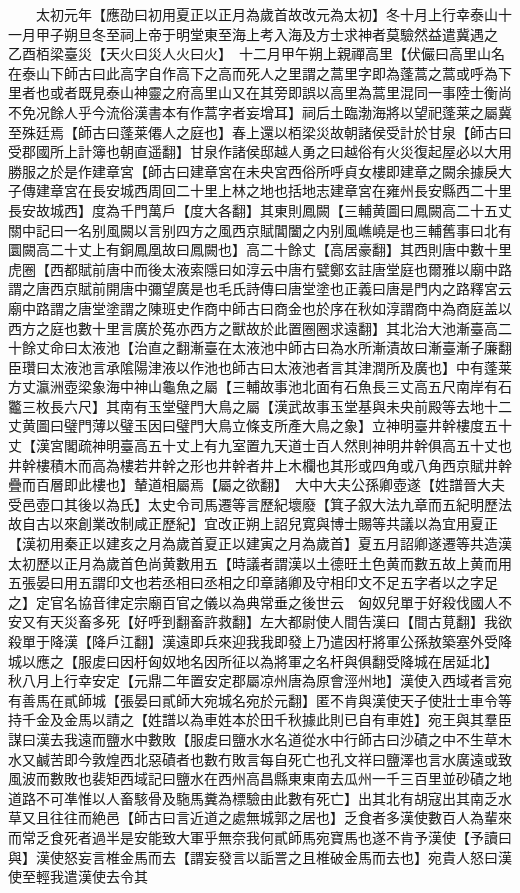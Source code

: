 　　太初元年【應劭曰初用夏正以正月為歲首故改元為太初】冬十月上行幸泰山十一月甲子朔旦冬至祠上帝于明堂東至海上考入海及方士求神者莫驗然益遣冀遇之　乙酉栢梁臺災【天火曰災人火曰火】　十二月甲午朔上親禪高里【伏儼曰高里山名在泰山下師古曰此高字自作高下之高而死人之里謂之蒿里字即為蓬蒿之蒿或呼為下里者也或者既見泰山神靈之府高里山又在其旁即誤以高里為蒿里混同一事陸士衡尚不免况餘人乎今流俗漢書本有作蒿字者妄增耳】祠后土臨渤海將以望祀蓬莱之屬冀至殊廷焉【師古曰蓬莱僊人之庭也】春上還以栢梁災故朝諸侯受計於甘泉【師古曰受郡國所上計簿也朝直遥翻】甘泉作諸侯邸越人勇之曰越俗有火災復起屋必以大用勝服之於是作建章宮【師古曰建章宮在未央宮西俗所呼貞女樓即建章之闕余據戾大子傳建章宮在長安城西周回二十里上林之地也括地志建章宮在雍州長安縣西二十里長安故城西】度為千門萬戶【度大各翻】其東則鳳闕【三輔黄圖曰鳳闕高二十五丈關中記曰一名别風闕以言别四方之風西京賦閶闔之内别風嶕嶢是也三輔舊事曰北有圜闕高二十丈上有銅鳳凰故曰鳳闕也】高二十餘丈【高居豪翻】其西則唐中數十里虎圈【西都賦前唐中而後太液索隱曰如淳云中唐冇甓鄭玄註唐堂庭也爾雅以廟中路謂之唐西京賦前開唐中彌望廣是也毛氏詩傳曰唐堂塗也正義曰唐是門内之路釋宮云廟中路謂之唐堂塗謂之陳班史作商中師古曰商金也於序在秋如淳謂商中為商庭盖以西方之庭也數十里言廣於菟亦西方之獸故於此置圈圈求遠翻】其北治大池漸臺高二十餘丈命曰太液池【治直之翻漸臺在太液池中師古曰為水所漸漬故曰漸臺漸子廉翻臣瓚曰太液池言承隂陽津液以作池也師古曰太液池者言其津潤所及廣也】中有蓬莱方丈瀛洲壺梁象海中神山龜魚之屬【三輔故事池北面有石魚長三丈高五尺南岸有石龞三枚長六尺】其南有玉堂璧門大鳥之屬【漢武故事玉堂基與未央前殿等去地十二丈黄圖曰璧門薄以璧玉因曰璧門大鳥立條支所產大鳥之象】立神明臺井幹樓度五十丈【漢宮閣疏神明臺高五十丈上有九室置九天道士百人然則神明井幹俱高五十丈也井幹樓積木而高為樓若井幹之形也井幹者井上木欄也其形或四角或八角西京賦井幹疊而百層即此樓也】輦道相屬焉【屬之欲翻】　大中大夫公孫卿壺遂【姓譜晉大夫受邑壺口其後以為氏】太史令司馬遷等言歷紀壞廢【箕子叙大法九章而五紀明歷法故自古以來創業改制咸正歷紀】宜改正朔上詔兒寛與博士賜等共議以為宜用夏正【漢初用秦正以建亥之月為歲首夏正以建寅之月為歲首】夏五月詔卿遂遷等共造漢太初歷以正月為歲首色尚黄數用五【時議者謂漢以土德旺土色黄而數五故上黄而用五張晏曰用五謂印文也若丞相曰丞相之印章諸卿及守相印文不足五字者以之字足之】定官名協音律定宗廟百官之儀以為典常垂之後世云　匈奴兒單于好殺伐國人不安又有天災畜多死【好呼到翻畜許救翻】左大都尉使人間告漢曰【間古莧翻】我欲殺單于降漢【降戶江翻】漢遠即兵來迎我我即發上乃遣因杅將軍公孫敖築塞外受降城以應之【服䖍曰因杅匈奴地名因所征以為將軍之名杆與俱翻受降城在居延北】　秋八月上行幸安定【元鼎二年置安定郡屬凉州唐為原會涇州地】漢使入西域者言宛有善馬在貳師城【張晏曰貳師大宛城名宛於元翻】匿不肯與漢使天子使壯士車令等持千金及金馬以請之【姓譜以為車姓本於田千秋據此則已自有車姓】宛王與其羣臣謀曰漢去我遠而鹽水中數敗【服䖍曰鹽水水名道從水中行師古曰沙磧之中不生草木水又鹹苦即今敦煌西北惡磧者也數冇敗言每自死亡也孔文祥曰鹽澤也言水廣遠或致風波而數敗也裴矩西域記曰鹽水在西州高昌縣東東南去瓜州一千三百里並砂磧之地道路不可凖惟以人畜駭骨及駞馬糞為標驗由此數有死亡】出其北有胡寇出其南乏水草又且往往而絶邑【師古曰言近道之處無城郭之居也】乏食者多漢使數百人為輩來而常乏食死者過半是安能致大軍乎無奈我何貳師馬宛寶馬也遂不肯予漢使【予讀曰與】漢使怒妄言椎金馬而去【謂妄發言以詬詈之且椎破金馬而去也】宛貴人怒曰漢使至輕我遣漢使去令其